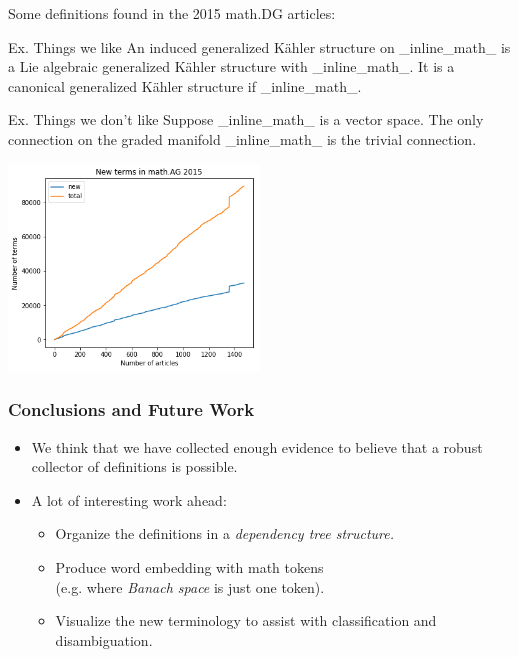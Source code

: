 \documentclass[10pt]{beamer}
\begin{document}
\begin{frame} 
    Some definitions found in the 2015 math.DG articles:
    \begin{block}{Ex. Things we like}
        {\small An {\color{blue}induced generalized Kähler structure} on \_inline\_math\_ is a Lie algebraic generalized Kähler structure with \_inline\_math\_. It is a canonical generalized Kähler structure if \_inline\_math\_.}
    \end{block}
    \begin{exampleblock}{Ex. Things we don't like}
        {\small Suppose \_inline\_math\_ is a {\color{darkgreen}vector space}. The only connection on the {\color{darkgreen}graded manifold} \_inline\_math\_ is the {\color{blue}trivial connection}.}
    \end{exampleblock}
        \begin{center}
    \includegraphics[width=0.5\textwidth]{cum_terms.png} 
        \end{center}
\end{frame}
\begin{frame} 
    \frametitle{Conclusions and Future Work}
    \begin{itemize}
            \item We think that we have collected enough evidence to believe that a robust collector of definitions is possible.
            \item A lot of interesting work ahead:
                \begin{itemize}
                    \item Organize the definitions in a \emph{dependency tree structure.}
                    \item Produce word embedding with math tokens\\
                        (e.g. where \emph{Banach space} is just one token).
                \item Visualize the new terminology to assist with classification and disambiguation. 
                \end{itemize}
    \end{itemize}
\end{frame}

\begin{frame}
\titlepage
\end{frame}
\end{document}

